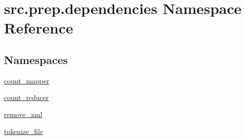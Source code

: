 \hypertarget{namespacesrc_1_1prep_1_1dependencies}{}\section{src.\+prep.\+dependencies Namespace Reference}
\label{namespacesrc_1_1prep_1_1dependencies}
\subsection*{Namespaces}
\begin{DoxyCompactItemize}
\item 
 \hyperlink{namespacesrc_1_1prep_1_1dependencies_1_1count__mapper}{count\+\_\+mapper}
\item 
 \hyperlink{namespacesrc_1_1prep_1_1dependencies_1_1count__reducer}{count\+\_\+reducer}
\item 
 \hyperlink{namespacesrc_1_1prep_1_1dependencies_1_1remove__xml}{remove\+\_\+xml}
\item 
 \hyperlink{namespacesrc_1_1prep_1_1dependencies_1_1tokenize__file}{tokenize\+\_\+file}
\end{DoxyCompactItemize}
